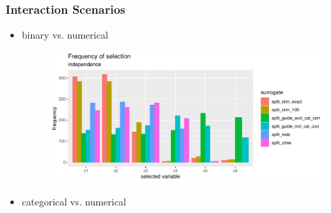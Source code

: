 \subsubsection{Interaction Scenarios}
\begin{itemize}
    \item binary vs. numerical
    \begin{figure}
    \includegraphics[width=16cm]{Figures/simulations/batchtools/selection_bias_general_10_01/independence.pdf}
\end{figure} 
    \item categorical vs. numerical
\end{itemize}




